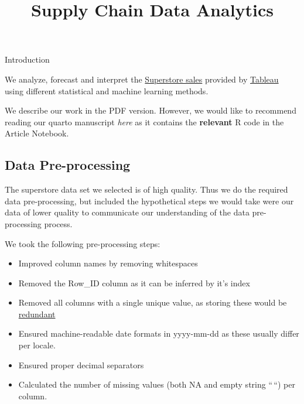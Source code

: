 \documentclass[
]{agujournal2019}
\providecommand{\tightlist}{%
  \setlength{\itemsep}{0pt}\setlength{\parskip}{0pt}}\usepackage{longtable,booktabs,array}
\begin{document}
\title{Supply Chain Data Analytics}








Introduction

We analyze, forecast and interpret the
\href{https://public.tableau.com/app/sample-data/sample_-_superstore.xls}{Superstore
sales} provided by
\href{https://public.tableau.com/app/learn/sample-data}{Tableau} using
different statistical and machine learning methods.

We describe our work in the PDF version. However, we would like to
recommend reading our quarto manuscript \emph{here} as it contains the
\textbf{relevant} R code in the Article Notebook.

\subsection{Data Pre-processing}\label{data-pre-processing}

The superstore data set we selected is of high quality. Thus we do the
required data pre-processing, but included the hypothetical steps we
would take were our data of lower quality to communicate our
understanding of the data pre-processing process.

We took the following pre-processing steps:

\begin{itemize}
\tightlist
\item
  Improved column names by removing whitespaces
\item
  Removed the Row\_ID column as it can be inferred by it's index
\item
  Removed all columns with a single unique value, as storing these would
  be
  \href{https://few.vu.nl/~molenaar/courses/StatR/chapters/B-06-raw_data.html}{redundant}
\item
  Ensured machine-readable date formats in yyyy-mm-dd as these usually
  differ per locale.
\item
  Ensured proper decimal separators
\item
  Calculated the number of missing values (both NA and empty string
  ``\,``) per column.
\end{itemize}
\end{document}
